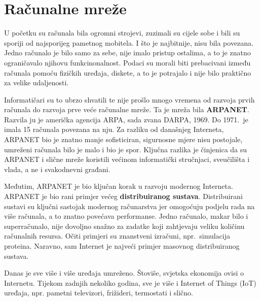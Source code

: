 

\section[Računalne mreže]{Računalne mreže}

U početku su računala bila ogromni strojevi, zuzimali su cijele sobe i bili su sporiji od najsporijeg pametnog mobitela.
I što je najbitnije, nisu bila povezana.
Jedno računalo je bilo samo za sebe, nije imalo pristup ostalima, a to je znatno ograničavalo njihovu funkcinonalnost.
Podaci su morali biti prebacivani između računala pomoću fizičkih uređaja, diskete, a to je potrajalo i nije bilo praktično za velike udaljenosti.

Informatičari su to ubrzo shvatili te nije prošlo mnogo vremena od razvoja prvih računala do razvoja prve veće računalne mreže.
Ta je mreža bila \textbf{ARPANET}.
Razvila ju je američka agencija ARPA, sada zvana DARPA, 1969.
Do 1971.\ je imala 15 računala povezana na nju.
Za razliku od današnjeg Interneta, ARPANET bio je znatno manje sofisticiran, sigurnosne mjere nisu postojale, umreženi računala bilo je malo i bio je spor.
Ključna razlika je činjenica da su ARPANET i slične mreže koristili većinom informatički stručnjaci, sveučilišta i vlada, a ne i svakodnevni građani.

Međutim, ARPANET je bio ključan korak u razvoju modernog Interneta.
ARPANET je bio rani primjer većeg \textbf{distribuiranog sustava}.
Distribuirani sustavi su ključni sastojak modernog računarstva jer omogoćuju podjelu rada na više računala, a to znatno povećava performanse.
Jedno računalo, makar bilo i superračunalo, nije dovoljno snažno za zadatke koji zahtjevaju veliku količinu računalnih resursa.
Očiti primjeri su znanstveni izračuni, npr.\ simulacija proteina.
Naravno, sam Internet je najveći primjer masovnog distribuiranog sustava.


Danas je sve više i više uređaja umreženo.
Štoviše, svjetska ekonomija ovisi o Internetu.
Tijekom zadnjih nekoliko godina, sve je više i Internet of Things (IoT) uređaja, npr. pametni televizori, frižideri, termostati i slično.

